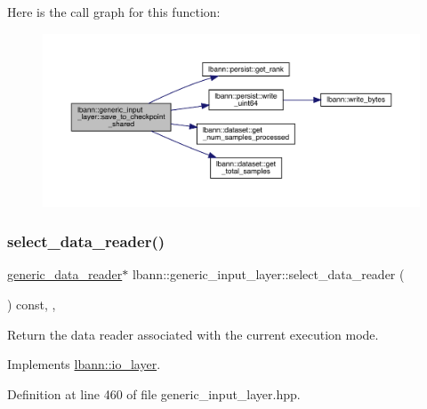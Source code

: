 Here is the call graph for this function\+:\nopagebreak
\begin{figure}[H]
\begin{center}
\leavevmode
\includegraphics[width=350pt]{classlbann_1_1generic__input__layer_abae61e13f47205491a43e4842808945d_cgraph}
\end{center}
\end{figure}
\mbox{\label{classlbann_1_1generic__input__layer_a9783805369ec7cfe5ce61c81baa5d2e2}} 
\subsubsection{\texorpdfstring{select\+\_\+data\+\_\+reader()}{select\_data\_reader()}}
{\footnotesize\ttfamily \hyperlink{classlbann_1_1generic__data__reader}{generic\+\_\+data\+\_\+reader}$\ast$ lbann\+::generic\+\_\+input\+\_\+layer\+::select\+\_\+data\+\_\+reader (\begin{DoxyParamCaption}{ }\end{DoxyParamCaption}) const\hspace{0.3cm}{\ttfamily [inline]}, {\ttfamily [override]}, {\ttfamily [virtual]}}

Return the data reader associated with the current execution mode. 

Implements \hyperlink{classlbann_1_1io__layer_aed46cd991ff11bad08933dc61492e26f}{lbann\+::io\+\_\+layer}.



Definition at line 460 of file generic\+\_\+input\+\_\+layer.\+hpp.


